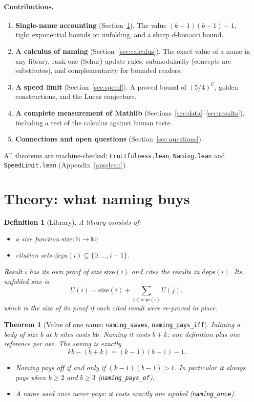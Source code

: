 \documentclass[11pt]{article}
\newtheorem{theorem}{Theorem}
\newtheorem{definition}{Definition}
\theoremstyle{remark}
\newcommand{\lean}[1]{\texttt{#1}}
\begin{document}
\paragraph{Contributions.}
\begin{enumerate}
\item \textbf{Single-name accounting} (Section~\ref{sec:theory}). The value
  $(k-1)(b-1)-1$, tight exponential bounds on unfolding, and a sharp $d$-bonacci bound.
\item \textbf{A calculus of naming} (Section~\ref{sec:calculus}). The exact value of a name
  in any library, rank-one (Schur) update rules, submodularity (concepts are
  substitutes), and complementarity for bounded readers.
\item \textbf{A speed limit} (Section~\ref{sec:speed}). A proved bound of $(5/4)^C$, golden
  constructions, and the Lucas conjecture.
\item \textbf{A complete measurement of Mathlib} (Sections~\ref{sec:data}--\ref{sec:results}),
  including a test of the calculus against human taste.
\item \textbf{Connections and open questions} (Section~\ref{sec:questions}).
\end{enumerate}
All theorems are machine-checked: \lean{Fruitfulness.lean}, \lean{Naming.lean} and
\lean{SpeedLimit.lean} (Appendix~\ref{app:lean}).

\section{Theory: what naming buys}\label{sec:theory}

\begin{definition}[Library]
A \emph{library} consists of:
\begin{itemize}
\item a size function $\mathrm{size}:\mathbb{N}\to\mathbb{N}$;
\item citation sets $\mathrm{deps}(i)\subseteq\{0,\dots,i-1\}$.
\end{itemize}
Result $i$ has its own proof of size $\mathrm{size}(i)$ and cites the results in
$\mathrm{deps}(i)$. Its \emph{unfolded size} is
\[
U(i)=\mathrm{size}(i)+\sum_{j\in\mathrm{deps}(i)}U(j),
\]
which is the size of its proof if each cited result were re-proved in place.
\end{definition}

\begin{theorem}[Value of one name; \lean{naming\_saves}, \lean{naming\_pays\_iff}]
Inlining a body of size $b$ at $k$ sites costs $kb$. Naming it costs $b+k$: one
definition plus one reference per use. The saving is exactly
\[
kb-(b+k)=(k-1)(b-1)-1.
\]
\begin{itemize}
\item Naming pays off if and only if $(k-1)(b-1)>1$. In particular it always pays when
  $k\ge 2$ and $b\ge 3$ (\lean{naming\_pays\_of}).
\item A name used once never pays: it costs exactly one symbol (\lean{naming\_once}).
\end{itemize}
\end{theorem}
\end{document}
